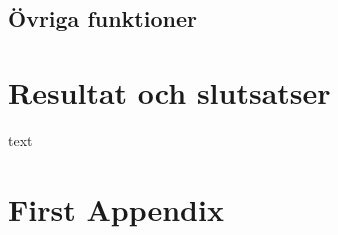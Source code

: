 \documentclass[11pt]{article}
\begin{document}
\begin{flushleft}
\subsection{Övriga funktioner}


\section{Resultat och slutsatser}
text

\pagebreak
{}




\pagebreak
\appendix
\section{First Appendix}

\end{flushleft}



\end{document}
